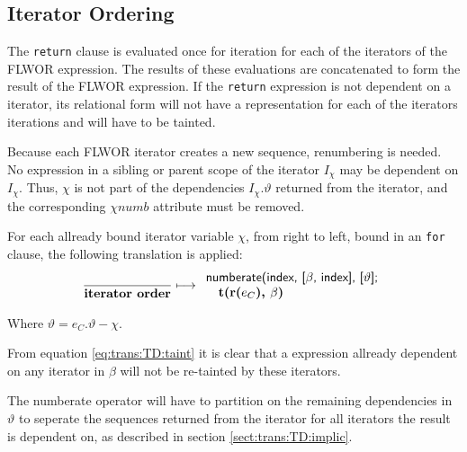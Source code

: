 \subsection{Iterator Ordering}
The \texttt{return} clause is evaluated once for iteration for each of the iterators of the FLWOR expression. The
results of these evaluations are concatenated to form the result of the FLWOR expression. If the \texttt{return}
expression is not dependent on a iterator, its relational form will not have a representation for each
of the iterators iterations and will have to be tainted.

Because each FLWOR iterator creates a new sequence, renumbering is needed. No expression in a sibling or parent
scope of the iterator $I_{\chi}$ may be dependent on $I_{\chi}$. Thus, $\chi$ is not part of the dependencies
$I_{\chi}.\vartheta$ returned from the iterator, and the corresponding $\chi{numb}$ attribute must be removed. 

For each allready bound iterator variable $\chi$, from right to left, bound in an \texttt{for} clause,
the following translation is applied:
\begin{equation}
\frac{}{\mbox{\textbf{iterator order}}}
\longmapsto
\begin{array}{l}
\mbox{\textsf{numberate(index, [}}\beta\mbox{\textsf{, index], [}}\vartheta\mbox{\textsf{];}} \\ \quad
\mbox{\textbf{t(r(}}e_{C}\mbox{\textbf{), }}\beta\mbox{\textbf{)}}
\end{array}
\label{rule:trans:TD:itOrd}
\end{equation}

Where $\vartheta = e_{C}.\vartheta - \chi$.

From equation \ref{eq:trans:TD:taint} it is clear that a expression allready dependent on any iterator in
$\beta$ will not be re-tainted by these iterators.

The \textsf{numberate} operator will have to partition on the remaining dependencies in $\vartheta$ to seperate
the sequences returned from the iterator for all iterators the result is dependent on, as described in section
\ref{sect:trans:TD:implic}.

